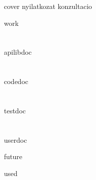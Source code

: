 \documentclass{book}
\begin{document}
{cover}
{nyilatkozat}
{konzultacio}

\tableofcontents
\newpage

{work}

\chapter{}

{apilibdoc}

\chapter{}

{codedoc}

\chapter{}

{testdoc}

\chapter{}

{userdoc}

{future}

{used}
\end{document}
